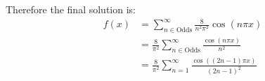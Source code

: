 \documentclass[letterpaper,8pt]{article}
\begin{document}
Therefore the final solution is:
\begin{align*}
f(x) &=  \sum_{n \in \text{Odds}}^\infty \frac{8}{n^2\pi^2} \cos ( n\pi x )  \\
     &= \frac{8}{\pi^2} \sum_{n \in \text{Odds}}^\infty \frac{ \cos ( n\pi x ) }{n^2} \\
     &= \frac{8}{\pi^2} \sum_{n = 1}^\infty \frac{ \cos ( (2n - 1)\pi x ) }{(2n - 1)^2} 
\end{align*}
\end{document}
